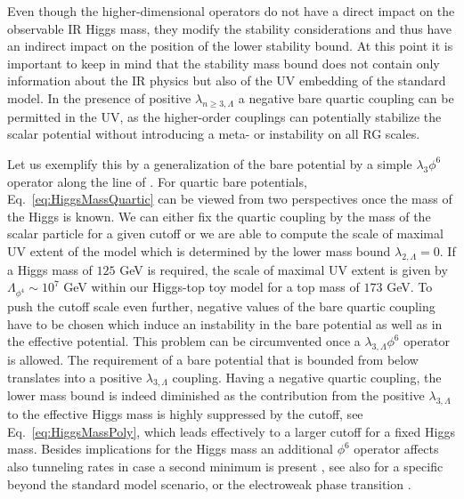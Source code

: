 \documentclass[twocolumn,aps,prd,showpacs,nofootinbib,superscriptaddress,preprintnumbers,floatfix,10pt]{revtex4-1}
\newcommand{\lL}{\lambda_{2,\Lambda}}
\begin{document}
Even though the higher-dimensional operators do not have a direct impact on the observable IR Higgs mass, they modify the stability considerations and thus have an indirect impact on the position of the lower stability bound. At this point it is important to keep in mind that the stability mass bound does not contain only information about the IR physics but also of the UV embedding of the standard model. In the presence of positive $\lambda_{n\geq 3,\Lambda}$ a negative bare quartic coupling can be permitted in the UV, as the higher-order couplings can potentially stabilize the scalar potential without introducing a meta- or instability on all RG scales.


Let us exemplify this by a generalization of the bare potential by a simple $\lambda_{3}\phi^{6}$ operator along the line of \cite{Gies:2013fua,Gies:2014xha,Borchardt:2016xju}. 
For quartic bare potentials, Eq.~\eqref{eq:HiggsMassQuartic} can be viewed from two perspectives once the mass of the Higgs is known. We can either fix the quartic coupling by the mass of the scalar particle for a given cutoff or we are able to compute the scale of maximal UV extent of the model which is determined by the lower mass bound $\lL=0$.
If a Higgs mass of $125$ GeV is required, the scale of maximal UV extent is given by $\Lambda_{\phi^{4}} \sim 10^{7}$ GeV within our Higgs-top toy model for a top mass of $173$ GeV.
To push the cutoff scale even further, negative values of the bare quartic coupling have to be chosen which induce an instability in the bare potential as well as in the effective potential. 
This problem can be circumvented once a $\lambda_{3,\Lambda} \phi^{6}$ operator is allowed. 
The requirement of a bare potential that is bounded from below translates into a positive $\lambda_{3,\Lambda}$ coupling. 
Having a negative quartic coupling, the lower mass bound is indeed diminished as the contribution from the positive $\lambda_{3,\Lambda}$ to the effective Higgs mass is highly suppressed by the cutoff, see Eq.~\eqref{eq:HiggsMassPoly}, which leads effectively to a larger cutoff for a fixed Higgs mass. 
Besides implications for the Higgs mass an additional $\phi^{6}$ operator affects also tunneling rates in case a second minimum is present \cite{Branchina:2013jra,Branchina:2014rva,Branchina:2014usa,Lalak:2014qua,Bentivegna:2017qry}, see also \cite{Branchina:2015nda} for a specific beyond the standard model scenario, or the electroweak phase transition \cite{Akerlund:2015fya,Chu:2017vmc}.
\end{document}
